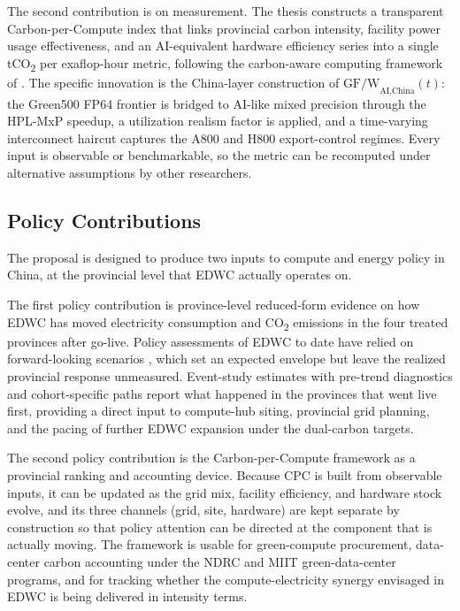 \documentclass[12pt,a4paper]{article}
\begin{document}
The second contribution is on measurement. The thesis constructs a
transparent Carbon-per-Compute index that links provincial carbon
intensity, facility power usage effectiveness, and an AI-equivalent
hardware efficiency series into a single tCO\textsubscript{2} per
exaflop-hour metric, following the carbon-aware computing framework
of \citet{guptaetal-2022-chasingcarbonelusive}. The specific
innovation is the China-layer construction of
$\text{GF/W}_{\text{AI,China}}(t)$: the Green500 FP64 frontier is
bridged to AI-like mixed precision through the HPL-MxP speedup, a
utilization realism factor is applied, and a time-varying
interconnect haircut captures the A800 and H800 export-control
regimes. Every input is observable or benchmarkable, so the metric
can be recomputed under alternative assumptions by other researchers.

\subsection{Policy Contributions}
%
%
%

The proposal is designed to produce two inputs to compute and
energy policy in China, at the provincial level that EDWC actually
operates on.

The first policy contribution is province-level reduced-form
evidence on how EDWC has moved electricity consumption and
CO\textsubscript{2} emissions in the four treated provinces after
go-live. Policy assessments of EDWC to date have relied on
forward-looking scenarios
\citep{zhengetal-2020-mitigatingcurtailmentcarbon,
zhangetal-2025-easterndatawestern}, which set an expected envelope
but leave the realized provincial response unmeasured. Event-study
estimates with pre-trend diagnostics and cohort-specific paths
report what happened in the provinces that went live first,
providing a direct input to compute-hub siting, provincial grid
planning, and the pacing of further EDWC expansion under the
dual-carbon targets.

The second policy contribution is the Carbon-per-Compute framework
as a provincial ranking and accounting device. Because CPC is built
from observable inputs, it can be updated as the grid mix, facility
efficiency, and hardware stock evolve, and its three channels (grid,
site, hardware) are kept separate by construction so that policy
attention can be directed at the component that is actually moving.
The framework is usable for green-compute procurement, data-center
carbon accounting under the NDRC and MIIT green-data-center programs,
and for tracking whether the compute-electricity synergy envisaged
in EDWC is being delivered in intensity terms.
\end{document}
